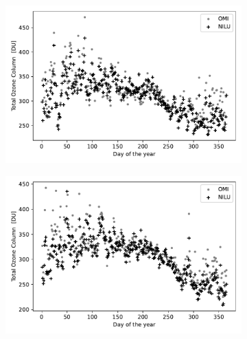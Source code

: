 \documentclass{optica-article}
\begin{document}
\begin{figure}
\begin{subfigure}[b]{0.45\textwidth}
	\includegraphics[width=\textwidth]{OMI_L3_NILU_O3_2014}
	\caption{}
	\label{fig:omil3niluo32014}
\end{subfigure}
\hfill
\begin{subfigure}[b]{0.45\textwidth}
	\includegraphics[width=\textwidth]{OMI_L3_NILU_O3_2015}
	\caption{}
	\label{fig:omil3niluo32015}
\end{subfigure}

\vspace{0.5cm}


\end{figure}
\end{document}
